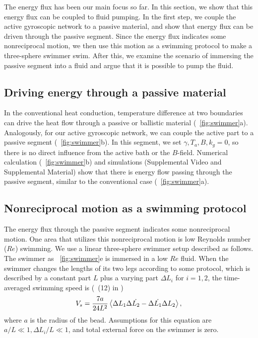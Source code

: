 \documentclass[
 preprint,
 preprintnumbers,
 amsmath,amssymb,
 aps,
 pre,
 longbibliography,
 superscriptaddress,
 10pt, twocolumn
]{revtex4-1}
\begin{document}
The energy flux has been our main focus so far. In this section, we show that this energy flux can be coupled to fluid pumping.
In the first step, we couple the active gyroscopic network to a passive material, and show that energy flux can be driven through the passive segment.
Since the energy flux indicates some nonreciprocal motion, we then use this motion as a swimming protocol to make a three-sphere swimmer \cite{Golestanian2008AnalyticResults} swim.
After this, we examine the scenario of immersing the passive segment into a fluid and argue that it is possible to pump the fluid.

\subsection{Driving energy through a passive material}
In the conventional heat conduction, temperature difference at two boundaries can drive the heat flow through a passive or ballistic material (\figurename~\ref{fig:swimmer}a).
Analogously, for our active gyroscopic network, we can couple the active part to a passive segment (\figurename~\ref{fig:swimmer}b). In this segment, we set $\gamma,T_a,B,k_g=0$, so there is no direct influence from the active bath or the $B$-field.
Numerical calculation (\figurename~\ref{fig:swimmer}b) and simulations (Supplemental Video and Supplemental Material) show that there is energy flow passing through the passive segment, similar to the conventional case (\figurename~\ref{fig:swimmer}a).


\subsection{Nonreciprocal motion as a swimming protocol}
The energy flux through the passive segment indicates some nonreciprocal motion. One area that utilizes this nonreciprocal motion is low Reynolds number ($Re$) swimming.
We use a linear three-sphere swimmer setup \cite{Golestanian2008AnalyticResults} described as follows. The swimmer as \figurename~\ref{fig:swimmer}e is immersed in a low $Re$ fluid. When the swimmer changes the lengths of its two legs according to some protocol, which is described by a constant part $L$ plus a varying part $\Delta L_i$ for $i=1,2$, the time-averaged swimming speed is (\eqnname~(12) in \cite{Golestanian2008AnalyticResults})
\begin{equation} \label{eqn:swimmer_speed}
    V_s = \frac{7a}{24L^2} \expval{\Delta L_1 \Delta \Dot{L_2} - \Delta \Dot{L_1} \Delta{L_2}},
\end{equation}
where $a$ is the radius of the bead. Assumptions for this equation are $a/L \ll 1, \Delta L_i/L \ll 1$, and total external force on the swimmer is zero.
\end{document}

